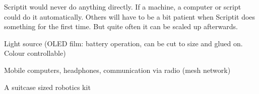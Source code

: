 \newpage
\begin{npcBox}[title=Scriptit continued]
    
    \begin{stressSection}
    \end{stressSection}
    \begin{tabularx}{\textwidth}{ XX }
    \end{tabularx}
    
    \begin{consequences}
    \item {}
    \item {}
    \item {}
    \end{consequences}
    
    \begin{npcDescription}
    Scriptit would never do anything directly. If a machine, a computer or script could do it automatically. Others will have to be a bit patient when Scriptit does something for the first time. But quite often it can be scaled up afterwards.

    \end{npcDescription}
    
    \begin{equipment}
        \item Light source (OLED film: battery operation, can be cut to size and glued on. Colour controllable)
        \item Mobile computers, headphones, communication via radio (mesh network)
        \item A suitcase sized robotics kit
    \end{equipment}
\end{npcBox}






